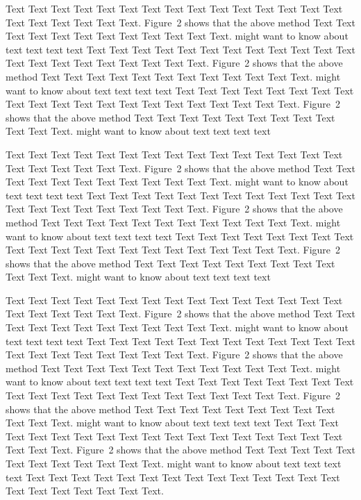\documentclass{bioinfo}
\begin{document}
\begin{methods}
Text Text Text Text Text Text  Text Text Text Text Text Text Text
Text Text  Text Text Text Text Text Text.
Figure~2\vphantom{\ref{fig:02}} shows that the above method  Text
Text Text Text  Text Text Text Text Text Text  Text Text.
\citealp{Boffelli03} might want to know about  text text text text
Text Text Text Text Text Text  Text Text Text Text Text Text Text
Text Text  Text Text Text Text Text Text.
Figure~2\vphantom{\ref{fig:02}} shows that the above method  Text
Text Text Text  Text Text Text Text Text Text  Text Text.
\citealp{Boffelli03} might want to know about  text text text text
Text Text Text Text Text Text Text Text Text Text Text Text Text
Text Text  Text Text Text Text Text Text.
Figure~2\vphantom{\ref{fig:02}} shows that the above method  Text
Text Text Text  Text Text Text Text Text Text  Text Text.
\citealp{Boffelli03} might want to know about  text text text text


Text Text Text Text Text Text  Text Text Text Text Text Text Text
Text Text  Text Text Text Text Text Text.
Figure~2\vphantom{\ref{fig:02}} shows that the above method  Text
Text Text Text  Text Text Text Text Text Text  Text Text.
\citealp{Boffelli03} might want to know about  text text text text
Text Text Text Text Text Text  Text Text Text Text Text Text Text
Text Text  Text Text Text Text Text Text.
Figure~2\vphantom{\ref{fig:02}} shows that the above method  Text
Text Text Text  Text Text Text Text Text Text  Text Text.
\citealp{Boffelli03} might want to know about  text text text text
Text Text Text Text Text Text Text Text Text Text Text Text Text
Text Text  Text Text Text Text Text Text.
Figure~2\vphantom{\ref{fig:02}} shows that the above method  Text
Text Text Text  Text Text Text Text Text Text  Text Text.
\citealp{Boffelli03} might want to know about  text text text text

Text Text Text Text Text Text  Text Text Text Text Text Text Text
Text Text  Text Text Text Text Text Text.
Figure~2\vphantom{\ref{fig:02}} shows that the above method  Text
Text Text Text  Text Text Text Text Text Text  Text Text.
\citealp{Boffelli03} might want to know about  text text text text
Text Text Text Text Text Text  Text Text Text Text Text Text Text
Text Text  Text Text Text Text Text Text.
Figure~2\vphantom{\ref{fig:02}} shows that the above method  Text
Text Text Text  Text Text Text Text Text Text  Text Text.
\citealp{Boffelli03} might want to know about  text text text text
Text Text Text Text Text Text Text Text Text Text Text Text Text
Text Text  Text Text Text Text Text Text.
Figure~2\vphantom{\ref{fig:02}} shows that the above method  Text
Text Text Text  Text Text Text Text Text Text  Text Text.
\citealp{Boffelli03} might want to know about  text text text text
Text Text Text Text Text Text  Text Text Text Text Text Text Text
Text Text  Text Text Text Text Text Text.
Figure~2\vphantom{\ref{fig:02}} shows that the above method  Text
Text Text Text  Text Text Text Text Text Text  Text Text.
\citealp{Boffelli03} might want to know about  text text text text
Text Text Text Text Text Text Text Text Text Text Text Text Text
Text Text  Text Text Text Text Text Text.



\end{methods}
\end{document}

